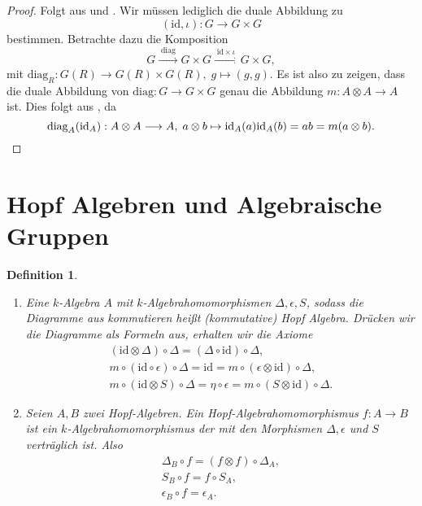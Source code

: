 \documentclass[a4paper, 11pt]{scrartcl}
\newcommand{\id}{\text{id}}
\theoremstyle{basicstyle}
\newtheorem{definition}{Definition}[section]
\begin{document}
    \begin{proof}
        Folgt aus  und .
        Wir müssen lediglich die duale Abbildung zu \[(\id, \iota): G \to G \times G\] bestimmen.
        Betrachte dazu die Komposition
        \[G \xrightarrow{\;\text{diag}\;} G \times G \xrightarrow{\;\id \times \iota\;} G \times G,\]
        mit \(\text{diag}_R: G(R) \to G(R) \times G(R), \; g \mapsto (g, g)\).
        Es ist also zu zeigen, dass die duale Abbildung von \(\text{diag}: G \to G \times G\) genau die Abbildung \(m: A \otimes A \to A\) ist.
        Dies folgt aus , da 
        \[\text{diag}_A(\id_A): A \otimes A \longrightarrow A, \; a \otimes b \mapsto \id_A(a)\id_A(b) = ab = m(a \otimes b).\qedhere\]
    \end{proof}

    
    \section{Hopf Algebren und Algebraische Gruppen}

    \begin{definition}
        \begin{enumerate}
            \item Eine \(k\)-Algebra \(A\) mit \(k\)-Algebrahomomorphismen \(\Delta, \epsilon, S\), sodass die Diagramme aus  kommutieren heißt \emph{(kommutative) Hopf Algebra}.
                Drücken wir die Diagramme als Formeln aus, erhalten wir die Axiome
                \begin{gather*}
                    (\id \otimes \Delta) \circ \Delta = (\Delta \circ \id) \circ \Delta, \\
                    m \circ (\id \circ \epsilon) \circ \Delta = \id = m \circ (\epsilon \otimes \id) \circ \Delta, \\
                    m \circ (\id \otimes S) \circ \Delta = \eta \circ \epsilon = m \circ (S \otimes \id) \circ \Delta.
                \end{gather*}

            \item Seien \(A, B\) zwei Hopf-Algebren.
                Ein Hopf-Algebrahomomorphismus \(f: A \to B\) ist ein \(k\)-Algebrahomomorphismus der mit den Morphismen \(\Delta, \epsilon\) und \(S\) verträglich ist.
                Also
                \begin{gather*}
                    \Delta_B \circ f = (f \otimes f) \circ \Delta_A, \\
                    S_B \circ f = f \circ S_A, \\
                    \epsilon_B \circ f = \epsilon_A.
                \end{gather*}
        \end{enumerate}
    \end{definition}
\end{document}
